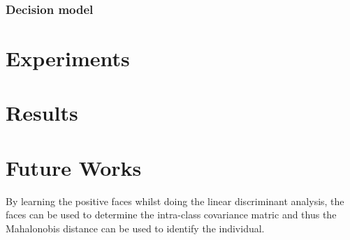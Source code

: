 \documentclass[10pt,a4paper,twocolumn]{article}
\begin{document}
\subsubsection{Decision model}



\section{Experiments}




\section{Results}




\section{Future Works}

By learning the positive faces whilst doing the linear discriminant analysis, the faces can be used to determine the intra-class covariance matric and thus the Mahalonobis distance can be used to identify the individual. 



\end{document}
